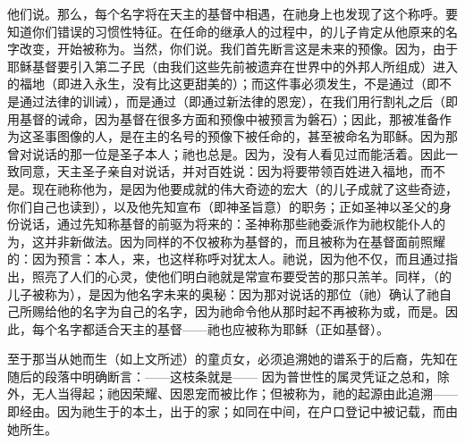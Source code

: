他们说。那么，每个名字将在天主的基督中相遇，在祂身上也发现了这个称呼。要知道你们错误的习惯性特征。在任命的继承人的过程中，的儿子肯定从他原来的名字改变，开始被称为。当然，你们说。我们首先断言这是未来的预像。因为，由于耶稣基督要引入第二子民（由我们这些先前被遗弃在世界中的外邦人所组成）进入的福地（即进入永生，没有比这更甜美的）；而这件事必须发生，不是通过（即不是通过法律的训诫），而是通过（即通过新法律的恩宠），在我们用行割礼之后（即用基督的诫命，因为基督在很多方面和预像中被预言为磐石）；因此，那被准备作为这圣事图像的人，是在主的名号的预像下被任命的，甚至被命名为耶稣。因为那曾对说话的那一位是圣子本人；祂也总是。因为，没有人看见过而能活着。因此一致同意，天主圣子亲自对说话，并对百姓说：因为将要带领百姓进入福地，而不是。现在祂称他为，是因为他要成就的伟大奇迹的宏大（的儿子成就了这些奇迹，你们自己也读到），以及他先知宣布（即神圣旨意）的职务；正如圣神以圣父的身份说话，通过先知称基督的前驱为将来的：圣神称那些祂委派作为祂权能仆人的为，这并非新做法。因为同样的不仅被称为基督的，而且被称为在基督面前照耀的：因为预言：本人，来，也这样称呼对犹太人。祂说，因为他不仅，而且通过指出，照亮了人们的心灵，使他们明白祂就是常宣布要受苦的那只羔羊。同样，（的儿子被称为），是因为他名字未来的奥秘：因为那对说话的那位（祂）确认了祂自己所赐给他的名字为自己的名字，因为祂命令他从那时起不再被称为或，而是。因此，每个名字都适合天主的基督——祂也应被称为耶稣（正如基督）。\par

至于那当从她而生（如上文所述）的童贞女，必须追溯她的谱系于的后裔，先知在随后的段落中明确断言：——这枝条就是—— 因为普世性的属灵凭证之总和，除外，无人当得起；祂因荣耀、因恩宠而被比作；但被称为，祂的起源由此追溯——即经由。因为祂生于的本土，出于的家；如同在中间，在户口登记中被记载，而由她所生。\par

